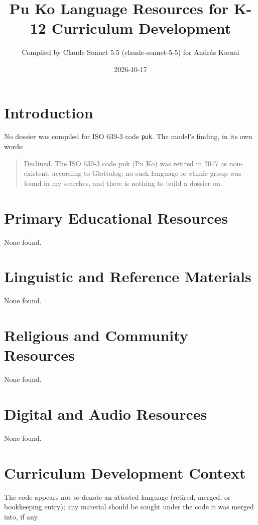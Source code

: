 \documentclass[12pt]{article}
\title{Pu Ko Language Resources for K-12 Curriculum Development}
\author{Compiled by Claude Sonnet 5.5 (claude-sonnet-5-5) for Andr\'as Kornai}
\date{2026-10-17}
\begin{document}
\maketitle

\section{Introduction}
No dossier was compiled for ISO 639-3 code \texttt{puk}. The model's finding, in its own words:

\begin{quote}
Declined. The ISO 639-3 code puk (Pu Ko) was retired in 2017 as non-existent, according to Glottolog; no such language or ethnic group was found in my searches, and there is nothing to build a dossier on.
\end{quote}

\section{Primary Educational Resources}
None found.
\section{Linguistic and Reference Materials}
None found.
\section{Religious and Community Resources}
None found.
\section{Digital and Audio Resources}
None found.
\section{Curriculum Development Context}
The code appears not to denote an attested language (retired, merged, or bookkeeping entry); any material should be sought under the code it was merged into, if any.
\end{document}
